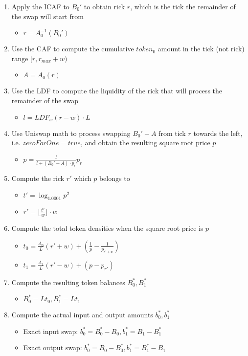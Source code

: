 \documentclass[twocolumn]{article}
\begin{document}
\begin{enumerate}
  \item Apply the ICAF to $B_0'$ to obtain rick $r$, which is the tick the remainder of the swap will start from
    \begin{itemize}
      \item $r = A_0^{-1}(B_0')$
    \end{itemize}
  \item Use the CAF to compute the cumulative $token_0$ amount in the tick (not rick) range $[r, r_{max} + w)$  
    \begin{itemize}
      \item $A = A_0(r)$
    \end{itemize}  
  \item Use the LDF to compute the liquidity of the rick that will process the remainder of the swap
    \begin{itemize}
      \item $l = LDF_w(r - w) \cdot L$
    \end{itemize}
  \item Use Uniswap math to process swapping $B_0' - A$ from tick $r$ towards the left, i.e. $zeroForOne = true$, and obtain the resulting square root price $p$
    \begin{itemize} 
      \item $p = \frac{l}{l + (B_0' - A)\cdot p_r} p_r$
    \end{itemize}
  \item Compute the rick $r'$ which $p$ belongs to
    \begin{itemize}
      \item $t' = \log_{1.0001} p^2$
      \item $r' = \lfloor \frac{t'}{w} \rfloor \cdot w$
    \end{itemize}
  \item Compute the total token densities when the square root price is $p$
    \begin{itemize}
      \item $t_0=\frac{A_0}{L}(r'+w) + (\frac{1}{p}-\frac{1}{p_{r'+w}})$
      \item $t_1=\frac{A_1}{L}(r'-w) + (p - p_{r'})$
    \end{itemize}
  \item Compute the resulting token balances $B_0^*, B_1^*$
    \begin{itemize} 
      \item $B_0^* = Lt_0, B_1^* = Lt_1$
    \end{itemize}
  \item Compute the actual input and output amounts $b_0^*, b_1^*$
    \begin{itemize}
      \item Exact input swap: $b_0^* = B_0^* - B_0, b_1^* = B_1 - B_1^*$
      \item Exact output swap: $b_0^* = B_0 - B_0^*, b_1^* = B_1^* - B_1$  
    \end{itemize}
\end{enumerate}
\end{document}
